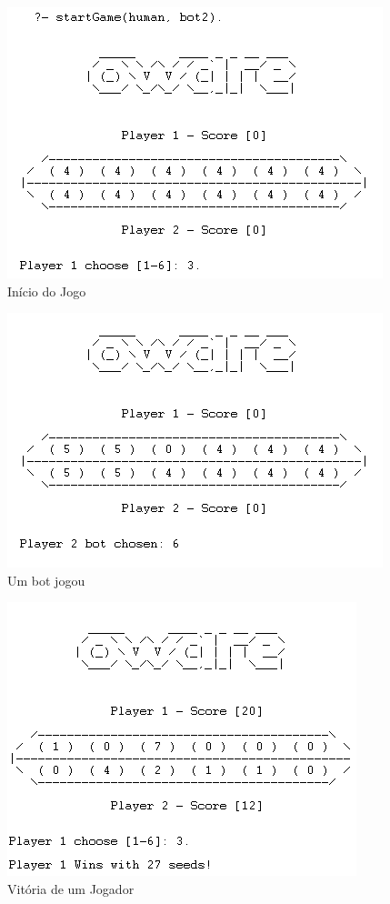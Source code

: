 \documentclass[15pt,a4paper]{article}
\begin{document}
\begin{figure}[h!]
	\begin{center}
	\includegraphics[scale=1]{owareBeginGame.png}
	\caption{Início do Jogo}
	\label{fig:Comeco}
	\end{center}
\end{figure}


\begin{figure}[h!]
	\begin{center}
	\includegraphics[scale=1]{owareBotPlays.png}
	\caption{Um bot jogou}
	\label{fig:Comeco}
	\end{center}
\end{figure}

\begin{figure}[h!]
	\begin{center}
	\includegraphics[scale=1]{owareVictory.png}
	\caption{Vitória de um Jogador}
	\label{fig:Comeco}
	\end{center}
\end{figure}
\newpage
\end{document}
